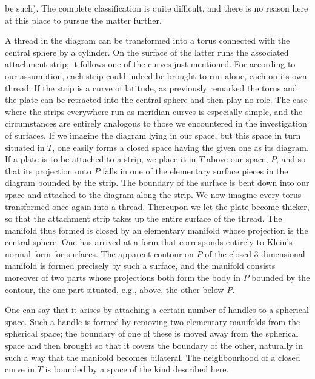 \documentclass{article}
\begin{document}
be such). The complete classification is quite difficult, and there is no reason here at this place to pursue the matter further.

A thread in the diagram can be transformed into a torus connected with the central sphere by a cylinder. On the surface of the latter runs the associated attachment strip; it follows one of the curves just mentioned. For according to our assumption, each strip could indeed be brought to run alone, each on its own thread. If the strip is a curve of latitude, as previously remarked the torus and the plate can be retracted into the central sphere and then play no role. The case where the strips everywhere run as meridian curves is especially simple, and the circumstances are entirely analogous to those we encountered in the investigation of surfaces. If we imagine the diagram lying in our space, but this space in turn situated in $T$, one easily forms a closed space having the given one as its diagram. If a plate is to be attached to a strip, we place it in $T$ above our space, $P$, and so that its projection onto $P$ falls in one of the elementary surface pieces in the diagram bounded by the strip. The boundary of the surface is bent down into our space and attached to the diagram along the strip. We now imagine every torus transformed once again into a thread. Thereupon we let the plate become thicker, so that the attachment strip takes up the entire surface of the thread. The manifold thus formed is closed by an elementary manifold whose projection is the central sphere. One has arrived at a form that corresponds entirely to Klein's normal form for surfaces. The apparent contour on $P$ of the closed 3-dimensional manifold is formed precisely by such a surface, and the manifold consists moreover of two parts whose projections both form the body in $P$ bounded by the contour, the one part situated, e.g., above, the other below $P$.

One can say that it arises by attaching a certain number of handles to a spherical space. Such a handle is formed by removing two elementary manifolds from the spherical space; the boundary of one of these is moved away from the spherical space and then brought so that it covers the boundary of the other, naturally in such a way that the manifold becomes bilateral. The neighbourhood of a closed curve in $T$ is bounded by a space of the kind described here.
\end{document}

